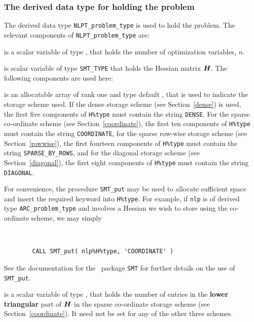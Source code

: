 \documentclass{galahad}
\newcommand{\packagename}{ARC}
\begin{document}

\subsubsection{The derived data type for holding the problem}\label{typeprob}
The derived data type {\tt NLPT\_problem\_type} is used to hold
the problem. The relevant components of
{\tt NLPT\_problem\_type}
are:

\begin{description}

 is a scalar variable of type \integer,
 that holds the number of optimization variables, $n$.

 is scalar variable of type {\tt SMT\_TYPE}
that holds the Hessian matrix ${\bm{H}}$. The following components
are used here:

\begin{description}

 is an allocatable array of rank one and type default
\character, that
is used to indicate the storage scheme used. If the dense storage scheme
(see Section~\ref{dense}) is used,
the first five components of {\tt H\%type} must contain the
string {\tt DENSE}.
For the sparse co-ordinate scheme (see Section~\ref{coordinate}),
the first ten components of {\tt H\%type} must contain the
string {\tt COORDINATE},
for the sparse row-wise storage scheme (see Section~\ref{rowwise}),
the first fourteen components of {\tt H\%type} must contain the
string {\tt SPARSE\_BY\_ROWS},
and for the diagonal storage scheme (see Section~\ref{diagonal}),
the first eight components of {\tt H\%type} must contain the
string {\tt DIAGONAL}.

For convenience, the procedure {\tt SMT\_put}
may be used to allocate sufficient space and insert the required keyword
into {\tt H\%type}.
For example, if {\tt nlp} is of derived type {\tt \packagename\_problem\_type}
and involves a Hessian we wish to store using the co-ordinate scheme,
we may simply
{\tt
\begin{verbatim}
        CALL SMT_put( nlp%H%type, 'COORDINATE' )
\end{verbatim}
}
\noindent
See the documentation for the \galahad\ package {\tt SMT}
for further details on the use of {\tt SMT\_put}.

 is a scalar variable of type \integer, that
holds the number of entries in the {\bf lower triangular} part of ${\bm{H}}$
in the sparse co-ordinate storage scheme (see Section~\ref{coordinate}).
It need not be set for any of the other three schemes.


\end{description}
\end{description}
\end{document}
